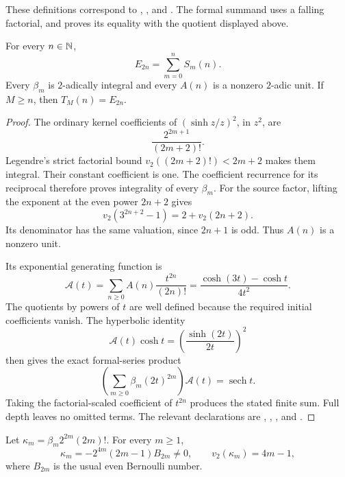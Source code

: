 These definitions correspond to
,
, and
.
The formal summand uses a falling factorial, and
proves its equality with the quotient displayed above.

\begin{lemma}
\label{lem:arith-reconstruction}
For every $n\in\mathbb N$,
\[
 E_{2n}=\sum_{m=0}^{n}S_m(n).
\]
Every $\beta_m$ is $2$-adically integral and every $A(n)$ is a nonzero
$2$-adic unit.  If $M\ge n$, then $T_M(n)=E_{2n}$.
\end{lemma}

\begin{proof}
The ordinary kernel coefficients of $(\sinh z/z)^2$, in $z^2$, are
\[
 \frac{2^{2m+1}}{(2m+2)!}.
\]
Legendre's strict factorial bound
$v_2((2m+2)!)<2m+2$ makes them integral.  Their constant coefficient is
one.  The coefficient recurrence for its reciprocal therefore
proves integrality of every $\beta_m$.
For the source factor, lifting the exponent at the even power $2n+2$
gives
\[
 v_2(3^{2n+2}-1)=2+v_2(2n+2).
\]
Its denominator has the same valuation, since $2n+1$ is odd.  Thus
$A(n)$ is a nonzero unit.

Its exponential generating function is
\[
 \mathcal A(t)=\sum_{n\ge0}A(n)\frac{t^{2n}}{(2n)!}
             =\frac{\cosh(3t)-\cosh t}{4t^2}.
\]
The quotients by powers of $t$ are well defined because the required
initial coefficients vanish.  The hyperbolic identity
\[
 \mathcal A(t)\cosh t=\left(\frac{\sinh(2t)}{2t}\right)^2
\]
then gives the exact formal-series product
\[
 \left(\sum_{m\ge0}\beta_m(2t)^{2m}\right)\mathcal A(t)
       =\operatorname{sech}t.
\]
Taking the factorial-scaled coefficient of $t^{2n}$ produces the stated
finite sum.  Full depth leaves no omitted terms.
The relevant declarations are
,
,
, and
.
\end{proof}

\begin{lemma}\label{lem:arith-kappa}
Let $\kappa_m=\beta_m2^{2m}(2m)!$.  For every $m\ge1$,
\[
 \kappa_m=-2^{4m}(2m-1)B_{2m}\ne0,\qquad
 v_2(\kappa_m)=4m-1,
\]
where $B_{2m}$ is the usual even Bernoulli number.
\end{lemma}

